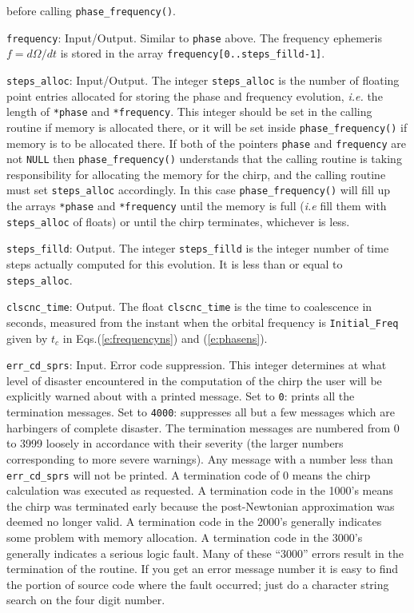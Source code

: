 \begin{description}
  before calling  {\tt  phase\_frequency()}.
\item{\tt frequency}: Input/Output. Similar to {\tt phase} above.
  The frequency ephemeris $f=d\Omega/dt$ is stored in the array 
  {\tt *frequency[0..steps\_filld-1]}.
\item{\tt steps\_alloc}: Input/Output. The integer
  {\tt *steps\_alloc} is the number of floating point entries
  allocated for storing the 
  phase and frequency evolution, {\it i.e.} the length of
  {\tt **phase} and {\tt **frequency}.
  This integer should be set in the calling
  routine if memory is allocated there,
  or it will be set inside {\tt  phase\_frequency()} if memory
  is to be allocated there.
  If both of the pointers {\tt *phase} and {\tt *frequency} are
  not {\tt NULL} then {\tt  phase\_frequency()} understands that
  the calling routine is taking responsibility
  for allocating the memory for the chirp, and the calling routine
  must set {\tt *steps\_alloc} accordingly. 
  In this case {\tt phase\_frequency()} will
  fill up the  arrays  {\tt **phase} and {\tt **frequency} until the memory
  is full ({\it i.e} fill them with {\tt *steps\_alloc} of floats)
  or until the chirp terminates, whichever is less.
\item{\tt steps\_filld}: Output. The integer {\tt *steps\_filld}
  is the integer number of time steps actually computed
  for this evolution. It is less than or equal to {\tt *steps\_alloc}.
\item{\tt clscnc\_time}: Output. The float {\tt *clscnc\_time}
 is the time to coalescence in seconds,
 measured from the instant when the orbital frequency is 
 {\tt Initial\_Freq} given by $t_c$ in Eqs.(\ref{e:frequencyns})
 and (\ref{e:phasens}).
\item{\tt err\_cd\_sprs}: Input. Error code suppression.
 This integer determines
 at what level of disaster encountered in the computation 
 of the chirp the user will be explicitly warned about
 with a printed message.
 Set to {\tt 0}: prints all the termination
 messages. Set to {\tt 4000}: suppresses
 all but a few messages which are  harbingers of complete disaster.
 The termination messages are numbered from 0 to 3999 
 loosely in accordance with their severity
 (the larger numbers corresponding to more severe warnings). 
 Any message with a number less than {\tt err\_cd\_sprs} will not
 be printed.
 A termination code of 0 means the chirp calculation was executed
 as requested.
 A termination code in the 1000's means the chirp was terminated
 early because the post-Newtonian approximation was deemed no longer
 valid.
 A termination code in the 2000's generally indicates some problem with
 memory allocation.
 A termination code in the 3000's generally indicates a serious logic fault.
 Many of these ``3000'' errors result in the termination of the routine.
 If you get an error message number it is easy to find the portion of 
 source code where the fault occurred; just do a character string search
 on the four digit number.
 
\end{description}

